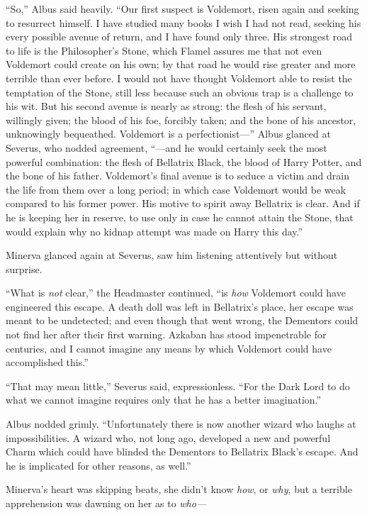 “So,” Albus said heavily. “Our first suspect is Voldemort, risen again and seeking to resurrect himself. I have studied many books I wish I had not read, seeking his every possible avenue of return, and I have found only three. His strongest road to life is the Philosopher’s Stone, which Flamel assures me that not even Voldemort could create on his own; by that road he would rise greater and more terrible than ever before. I would not have thought Voldemort able to resist the temptation of the Stone, still less because such an obvious trap is a challenge to his wit. But his second avenue is nearly as strong: the flesh of his servant, willingly given; the blood of his foe, forcibly taken; and the bone of his ancestor, unknowingly bequeathed. Voldemort is a perfectionist—” Albus glanced at Severus, who nodded agreement, “—and he would certainly seek the most powerful combination: the flesh of Bellatrix Black, the blood of Harry Potter, and the bone of his father. Voldemort’s final avenue is to seduce a victim and drain the life from them over a long period; in which case Voldemort would be weak compared to his former power. His motive to spirit away Bellatrix is clear. And if he is keeping her in reserve, to use only in case he cannot attain the Stone, that would explain why no kidnap attempt was made on Harry this day.”

Minerva glanced again at Severus, saw him listening attentively but without surprise.

“What is \emph{not} clear,” the Headmaster continued, “is \emph{how} Voldemort could have engineered this escape. A death doll was left in Bellatrix’s place, her escape was meant to be undetected; and even though that went wrong, the Dementors could not find her after their first warning. Azkaban has stood impenetrable for centuries, and I cannot imagine any means by which Voldemort could have accomplished this.”

“That may mean little,” Severus said, expressionless. “For the Dark Lord to do what we cannot imagine requires only that he has a better imagination.”

Albus nodded grimly. “Unfortunately there is now another wizard who laughs at impossibilities. A wizard who, not long ago, developed a new and powerful Charm which could have blinded the Dementors to Bellatrix Black’s escape. And he is implicated for other reasons, as well.”

Minerva’s heart was skipping beats, she didn’t know \emph{how}, or \emph{why}, but a terrible apprehension was dawning on her as to \emph{who—}

